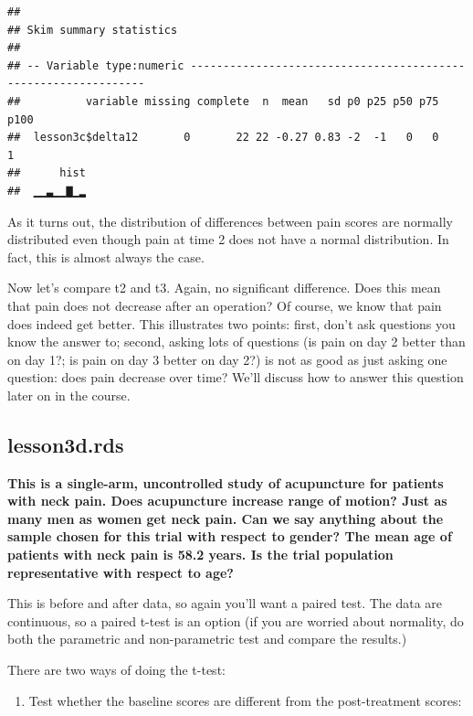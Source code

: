 \documentclass[]{book}
\providecommand{\tightlist}{%
  \setlength{\itemsep}{0pt}\setlength{\parskip}{0pt}}
\begin{document}
\begin{verbatim}
## 
## Skim summary statistics
## 
## -- Variable type:numeric ---------------------------------------------------------------
##          variable missing complete  n  mean   sd p0 p25 p50 p75 p100
##  lesson3c$delta12       0       22 22 -0.27 0.83 -2  -1   0   0    1
##      hist
##  ▁▁▃▁▁▇▁▂
\end{verbatim}

As it turns out, the distribution of differences between pain scores are normally distributed even though pain at time 2 does not have a normal distribution. In fact, this is almost always the case.

Now let's compare t2 and t3. Again, no significant difference. Does this mean that pain does not decrease after an operation? Of course, we know that pain does indeed get better. This illustrates two points: first, don't ask questions you know the answer to; second, asking lots of questions (is pain on day 2 better than on day 1?; is pain on day 3 better on day 2?) is not as good as just asking one question: does pain decrease over time? We'll discuss how to answer this question later on in the course.

\hypertarget{lesson3d.rds}{%
\subsection{lesson3d.rds}\label{lesson3d.rds}}

\textbf{This is a single-arm, uncontrolled study of acupuncture for patients with neck pain. Does acupuncture increase range of motion? Just as many men as women get neck pain. Can we say anything about the sample chosen for this trial with respect to gender? The mean age of patients with neck pain is 58.2 years. Is the trial population representative with respect to age?}

This is before and after data, so again you'll want a paired test. The data are continuous, so a paired t-test is an option (if you are worried about normality, do both the parametric and non-parametric test and compare the results.)

There are two ways of doing the t-test:

\begin{enumerate}
\def\labelenumi{\arabic{enumi})}
\tightlist
\item
  Test whether the baseline scores are different from the post-treatment scores:
\end{enumerate}
\end{document}
